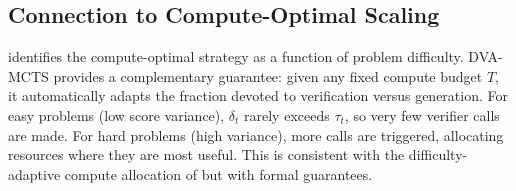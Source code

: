 \subsection{Connection to Compute-Optimal Scaling}

\citet{snell2024scaling} identifies the compute-optimal strategy as a function of
problem difficulty. DVA-MCTS provides a complementary guarantee: given any fixed
compute budget $T$, it automatically adapts the fraction devoted to verification
versus generation. For easy problems (low score variance), $\delta_t$ rarely
exceeds $\tau_t$, so very few verifier calls are made. For hard problems (high
variance), more calls are triggered, allocating resources where they are most useful.
This is consistent with the difficulty-adaptive compute allocation of
\citet{wu2024inference} but with formal guarantees.
